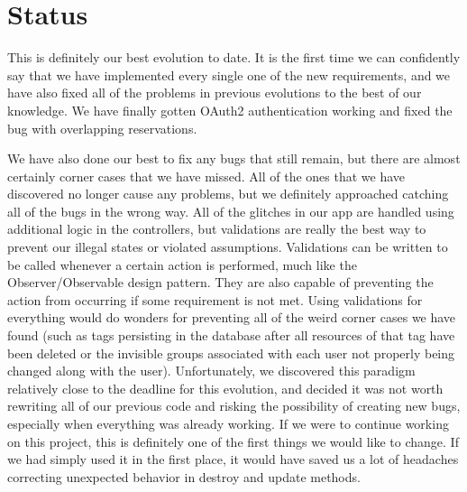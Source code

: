\documentclass{article}
\begin{document}
\section{Status}
This is definitely our best evolution to date.  It is the first time we can confidently say that we have implemented every single one of the new requirements, and we have also fixed all of the problems in previous evolutions to the best of our knowledge.  We have finally gotten OAuth2 authentication working and fixed the bug with overlapping reservations.\par
We have also done our best to fix any bugs that still remain, but there are almost certainly corner cases that we have missed.  All of the ones that we have discovered no longer cause any problems, but we definitely approached catching all of the bugs in the wrong way.  All of the glitches in our app are handled using additional logic in the controllers, but validations are really the best way to prevent our illegal states or violated assumptions.  Validations can be written to be called whenever a certain action is performed, much like the Observer/Observable design pattern.  They are also capable of preventing the action from occurring if some requirement is not met.  Using validations for everything would do wonders for preventing all of the weird corner cases we have found (such as tags persisting in the database after all resources of that tag have been deleted or the invisible groups associated with each user not properly being changed along with the user).  Unfortunately, we discovered this paradigm relatively close to the deadline for this evolution, and decided it was not worth rewriting all of our previous code and risking the possibility of creating new bugs, especially when everything was already working.  If we were to continue working on this project, this is definitely one of the first things we would like to change.  If we had simply used it in the first place, it would have saved us a lot of headaches correcting unexpected behavior in destroy and update methods.
\end{document}

